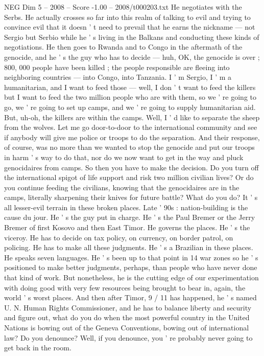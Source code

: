 \begin{textsample}{NEG Dim 5 – 2008 – Score -1.00 – 2008/t000203.txt}
He negotiates with the Serbs.
He actually crosses so far into this realm of talking to evil and trying to convince evil that it doesn ' t need to prevail that he earns the nickname — not Sergio but Serbio while he ' s living in the Balkans and conducting these kinds of negotiations.
He then goes to Rwanda and to Congo in the aftermath of the genocide, and he ' s the guy who has to decide — huh, OK, the genocide is over ; 800, 000 people have been killed ; the people responsible are fleeing into neighboring countries — into Congo, into Tanzania.
I ' m Sergio, I ' m a humanitarian, and I want to feed those — well, I don ' t want to feed the killers but I want to feed the two million people who are with them, so we ' re going to go, we ' re going to set up camps, and we ' re going to supply humanitarian aid.
But, uh-oh, the killers are within the camps.
Well, I ' d like to separate the sheep from the wolves.
Let me go door-to-door to the international community and see if anybody will give me police or troops to do the separation.
And their response, of course, was no more than we wanted to stop the genocide and put our troops in harm ' s way to do that, nor do we now want to get in the way and pluck genocidaires from camps.
So then you have to make the decision.
Do you turn off the international spigot of life support and risk two million civilian lives?
Or do you continue feeding the civilians, knowing that the genocidaires are in the camps, literally sharpening their knives for future battle?
What do you do?
It ' s all lesser-evil terrain in these broken places.
Late ' 90s : nation-building is the cause du jour.
He ' s the guy put in charge.
He ' s the Paul Bremer or the Jerry Bremer of first Kosovo and then East Timor.
He governs the places.
He ' s the viceroy.
He has to decide on tax policy, on currency, on border patrol, on policing.
He has to make all these judgments.
He ' s a Brazilian in these places.
He speaks seven languages.
He ' s been up to that point in 14 war zones so he ' s positioned to make better judgments, perhaps, than people who have never done that kind of work.
But nonetheless, he is the cutting edge of our experimentation with doing good with very few resources being brought to bear in, again, the world ' s worst places.
And then after Timor, 9 / 11 has happened, he ' s named U.
N.
Human Rights Commissioner, and he has to balance liberty and security and figure out, what do you do when the most powerful country in the United Nations is bowing out of the Geneva Conventions, bowing out of international law?
Do you denounce?
Well, if you denounce, you ' re probably never going to get back in the room.

\end{textsample}
